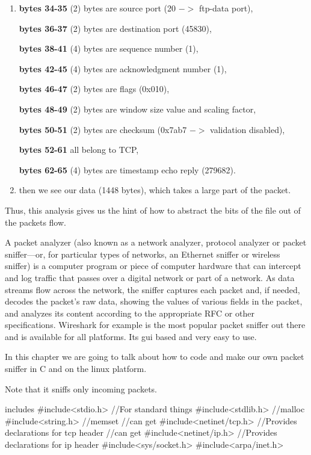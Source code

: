 \begin{enumerate}
\item {\bf bytes 34-35} (2) bytes are source port (20 $->$ ftp-data port), 

{\bf bytes 36-37} (2) bytes are destination port (45830), 

{\bf bytes 38-41} (4) bytes are sequence number (1), 

{\bf bytes 42-45} (4) bytes are acknowledgment number (1), 

{\bf bytes 46-47} (2) bytes are flags (0x010), 

{\bf bytes 48-49} (2) bytes are window size value and scaling factor, 

{\bf bytes 50-51} (2) bytes are checksum (0x7ab7 $->$ validation
disabled), 

{\bf bytes 52-61} all belong to TCP, 

{\bf bytes 62-65} (4) bytes are timestamp echo reply (279682).

\item then we see our data (1448 bytes), 
which takes a large part of the packet.
\end{enumerate}

Thus, this analysis gives us the hint of how to abstract the bits of
the file out of the packets flow.

A packet analyzer (also known as a network analyzer, protocol analyzer
or packet sniffer—or, for particular types of networks, an Ethernet
sniffer or wireless sniffer) is a computer program or piece of
computer hardware that can intercept and log traffic that passes over
a digital network or part of a network. As data streams flow across
the network, the sniffer captures each packet and, if needed, decodes
the packet's raw data, showing the values of various fields in the
packet, and analyzes its content according to the appropriate RFC or
other specifications. \cite{39} Wireshark for example is the most
popular packet sniffer out there and is available for all
platforms. Its gui based and very easy to use.

In this chapter we are going to talk about how to code and make our own packet sniffer in C and on the linux platform. 

Note that it sniffs only incoming packets.

\begin{chunk}{includes}
#include<stdio.h> //For standard things
#include<stdlib.h>    //malloc
#include<string.h>    //memset
//can get
#include<netinet/tcp.h>   //Provides declarations for tcp header
//can get
#include<netinet/ip.h>    //Provides declarations for ip header
#include<sys/socket.h>
#include<arpa/inet.h>

\end{chunk}

